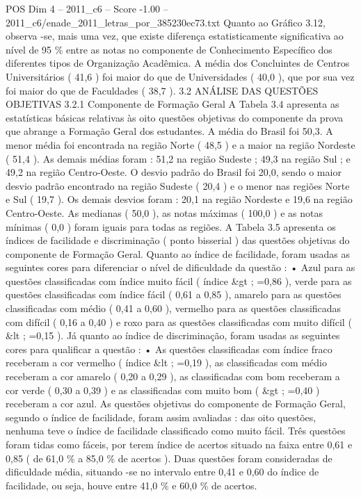 \begin{textsample}{POS Dim 4 – 2011\_c6 – Score -1.00 – 2011\_c6/enade\_2011\_letras\_por\_385230ec73.txt}
Quanto ao Gráfico 3.12, observa -se, mais uma vez, que existe diferença estatisticamente significativa ao nível de 95 \% entre as notas no componente de Conhecimento Específico dos diferentes tipos de Organização Acadêmica.
A média dos Concluintes de Centros Universitários ( 41,6 ) foi maior do que de Universidades ( 40,0 ), que por sua vez foi maior do que de Faculdades ( 38,7 ). 3.2 ANÁLISE DAS QUESTÕES OBJETIVAS 3.2.1 Componente de Formação Geral A Tabela 3.4 apresenta as estatísticas básicas relativas às oito questões objetivas do componente da prova que abrange a Formação Geral dos estudantes.
A média do Brasil foi 50,3.
A menor média foi encontrada na região Norte ( 48,5 ) e a maior na região Nordeste ( 51,4 ).
As demais médias foram : 51,2 na região Sudeste ; 49,3 na região Sul ; e 49,2 na região Centro-Oeste.
O desvio padrão do Brasil foi 20,0, sendo o maior desvio padrão encontrado na região Sudeste ( 20,4 ) e o menor nas regiões Norte e Sul ( 19,7 ).
Os demais desvios foram : 20,1 na região Nordeste e 19,6 na região Centro-Oeste.
As medianas ( 50,0 ), as notas máximas ( 100,0 ) e as notas mínimas ( 0,0 ) foram iguais para todas as regiões.
A Tabela 3.5 apresenta os índices de facilidade e discriminação ( ponto bisserial ) das questões objetivas do componente de Formação Geral.
Quanto ao índice de facilidade, foram usadas as seguintes cores para diferenciar o nível de dificuldade da questão : • Azul para as questões classificadas com índice muito fácil ( índice \&gt ; =0,86 ), verde para as questões classificadas com índice fácil ( 0,61 a 0,85 ), amarelo para as questões classificadas com médio ( 0,41 a 0,60 ), vermelho para as questões classificadas com difícil ( 0,16 a 0,40 ) e roxo para as questões classificadas com muito difícil ( \&lt ; =0,15 ).
Já quanto ao índice de discriminação, foram usadas as seguintes cores para qualificar a questão : • As questões classificadas com índice fraco receberam a cor vermelho ( índice \&lt ; =0,19 ), as classificadas com médio receberam a cor amarelo ( 0,20 a 0,29 ), as classificadas com bom receberam a cor verde ( 0,30 a 0,39 ) e as classificadas com muito bom ( \&gt ; =0,40 ) receberam a cor azul.
As questões objetivas do componente de Formação Geral, segundo o índice de facilidade, foram assim avaliadas : das oito questões, nenhuma teve o índice de facilidade classificado como muito fácil.
Três questões foram tidas como fáceis, por terem índice de acertos situado na faixa entre 0,61 e 0,85 ( de 61,0 \% a 85,0 \% de acertos ).
Duas questões foram consideradas de dificuldade média, situando -se no intervalo entre 0,41 e 0,60 do índice de facilidade, ou seja, houve entre 41,0 \% e 60,0 \% de acertos.

\end{textsample}
